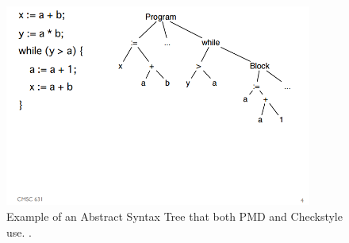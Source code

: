 \begin{figure}[H]
\begin{center}
	\includegraphics[width=0.9\textwidth]{image001.png}
\end{center}
\caption{Example of an Abstract Syntax Tree that both PMD and Checkstyle use. \cite{1_foster_2016}.}
\end{figure}

 